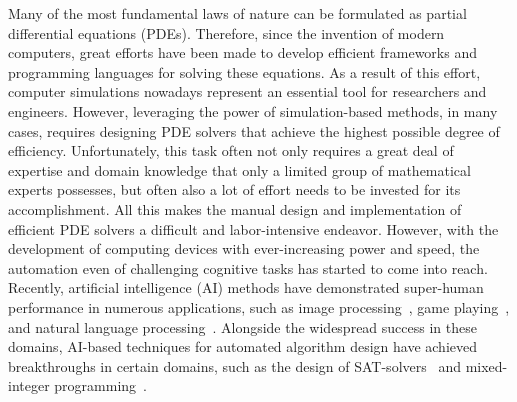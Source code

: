 Many of the most fundamental laws of nature can be formulated as partial differential equations (PDEs).
Therefore, since the invention of modern computers, great efforts have been made to develop efficient frameworks and programming languages for solving these equations.
As a result of this effort, computer simulations nowadays represent an essential tool for researchers and engineers.
However, leveraging the power of simulation-based methods, in many cases, requires designing PDE solvers that achieve the highest possible degree of efficiency.
Unfortunately, this task often not only requires a great deal of expertise and domain knowledge that only a limited group of mathematical experts possesses, but often also a lot of effort needs to be invested for its accomplishment.
All this makes the manual design and implementation of efficient PDE solvers a difficult and labor-intensive endeavor.
However, with the development of computing devices with ever-increasing power and speed, the automation even of challenging cognitive tasks has started to come into reach.
Recently, artificial intelligence (AI) methods have demonstrated super-human performance in numerous applications, such as image processing~\cite{krizhevsky2017imagenet}, game playing~\cite{schrittwieser2020mastering,reed2022generalist}, and natural language processing~\cite{brown2020language}.
Alongside the widespread success in these domains, AI-based techniques for automated algorithm design have achieved breakthroughs in certain domains, such as the design of SAT-solvers~\cite{khudabukhsh2016satenstein} and mixed-integer programming~\cite{hutter2010automated}.

